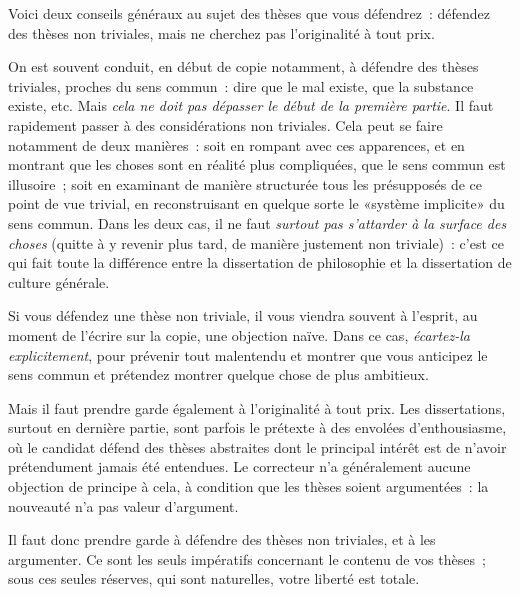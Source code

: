 \documentclass[a4paper,11pt]{article}
\begin{document}
\par

Voici deux conseils généraux au sujet des thèses que vous défendrez~:
défendez des thèses non triviales, mais ne cherchez pas l'originalité à
tout prix.

\par

On est souvent conduit, en début de copie notamment, à défendre des
thèses triviales, proches du sens commun~: dire que le mal existe, que
la substance existe, etc. Mais \emph{cela ne doit pas dépasser le début
  de la première partie}. Il faut rapidement passer à des considérations
non triviales. Cela peut se faire notamment de deux manières~: soit en
rompant avec ces apparences, et en montrant que les choses sont en
réalité plus compliquées, que le sens commun est illusoire~; soit en
examinant de manière structurée tous les présupposés de ce point de vue
trivial, en reconstruisant en quelque sorte le «système implicite» du
sens commun. Dans les deux cas, il ne faut \emph{surtout pas s'attarder
  à la surface des choses} (quitte à y revenir plus tard, de manière
justement non triviale)~: c'est ce qui fait toute la différence entre la
dissertation de philosophie et la dissertation de culture générale.

\par

Si vous défendez une thèse non triviale, il vous viendra souvent à
l'esprit, au moment de l'écrire sur la copie, une objection naïve. Dans
ce cas, \emph{écartez-la explicitement}, pour prévenir tout malentendu
et montrer que vous anticipez le sens commun et prétendez montrer
quelque chose de plus ambitieux.

\par

Mais il faut prendre garde également à l'originalité à tout prix. Les
dissertations, surtout en dernière partie, sont parfois le prétexte à
des envolées d'enthousiasme, où le candidat défend des thèses abstraites
dont le principal intérêt est de n'avoir prétendument jamais été
entendues. Le correcteur n'a généralement aucune objection de principe à
cela, à condition que les thèses soient argumentées~: la nouveauté n'a
pas valeur d'argument.

\par

Il faut donc prendre garde à défendre des thèses non triviales, et à les
argumenter. Ce sont les seuls impératifs concernant le contenu de vos
thèses~; sous ces seules réserves, qui sont naturelles, votre liberté
est totale.
\end{document}
